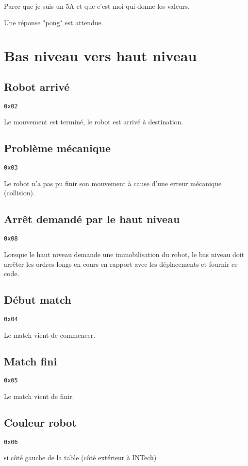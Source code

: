 \documentclass[a4paper, 12pt]{article}
\begin{document}
    Parce que je suis un 5A et que c'est moi qui donne les valeurs.
    
    Une réponse "pong" est attendue.

\section{Bas niveau vers haut niveau}

\subsection{Robot arrivé}
    \texttt{0x02}
    
Le mouvement est terminé, le robot est arrivé à destination.
    
\subsection{Problème mécanique}
    \texttt{0x03}
    
Le robot n'a pas pu finir son mouvement à cause d'une erreur mécanique (collision).

\subsection{Arrêt demandé par le haut niveau}
    \texttt{0x08}
    
Lorsque le haut niveau demande une immobilisation du robot, le bas niveau doit arrêter les ordres longs en cours en rapport avec les déplacements et fournir ce code.
    
\subsection{Début match}
    \texttt{0x04}

Le match vient de commencer.
    
\subsection{Match fini}
    \texttt{0x05}
    
Le match vient de finir.
    
\subsection{Couleur robot}
    \texttt{0x06}
    
    si côté gauche de la table (côté extérieur à INTech)
    
\end{document}
